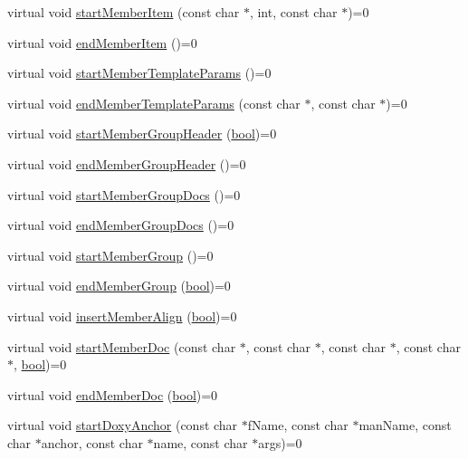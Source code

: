 \begin{DoxyCompactItemize}
\item 
virtual void \hyperlink{class_output_generator_a626142e0dd357e23058573aff5299eb6}{start\+Member\+Item} (const char $\ast$, int, const char $\ast$)=0
\item 
virtual void \hyperlink{class_output_generator_aac81201cfd0dedc7635bc81913906335}{end\+Member\+Item} ()=0
\item 
virtual void \hyperlink{class_output_generator_af221e843bf8828e9dcb45faea48c8af2}{start\+Member\+Template\+Params} ()=0
\item 
virtual void \hyperlink{class_output_generator_a0175d6eb2630de31743136c083d0cb84}{end\+Member\+Template\+Params} (const char $\ast$, const char $\ast$)=0
\item 
virtual void \hyperlink{class_output_generator_aea2631f3e52efb116a4b3375755024c8}{start\+Member\+Group\+Header} (\hyperlink{qglobal_8h_a1062901a7428fdd9c7f180f5e01ea056}{bool})=0
\item 
virtual void \hyperlink{class_output_generator_a585ab0b649dad9edf7b78e8f1ec20885}{end\+Member\+Group\+Header} ()=0
\item 
virtual void \hyperlink{class_output_generator_a0b3d9ddaa7d63cea43081ac17ce5e96b}{start\+Member\+Group\+Docs} ()=0
\item 
virtual void \hyperlink{class_output_generator_a7debb7a4d6584e8855e7dc9ce0594d99}{end\+Member\+Group\+Docs} ()=0
\item 
virtual void \hyperlink{class_output_generator_a1cc976995007c64aa044d98da900d09f}{start\+Member\+Group} ()=0
\item 
virtual void \hyperlink{class_output_generator_a6b020947c7d4cd3a2d2d8c0993fbb4e3}{end\+Member\+Group} (\hyperlink{qglobal_8h_a1062901a7428fdd9c7f180f5e01ea056}{bool})=0
\item 
virtual void \hyperlink{class_output_generator_a0df59cf6b0b238b48b139c7bfe5fb901}{insert\+Member\+Align} (\hyperlink{qglobal_8h_a1062901a7428fdd9c7f180f5e01ea056}{bool})=0
\item 
virtual void \hyperlink{class_output_generator_a9cd56ff964c1d6a592b25dd7fd036d23}{start\+Member\+Doc} (const char $\ast$, const char $\ast$, const char $\ast$, const char $\ast$, \hyperlink{qglobal_8h_a1062901a7428fdd9c7f180f5e01ea056}{bool})=0
\item 
virtual void \hyperlink{class_output_generator_adcab4ec924ae47924fdc3492a06d432b}{end\+Member\+Doc} (\hyperlink{qglobal_8h_a1062901a7428fdd9c7f180f5e01ea056}{bool})=0
\item 
virtual void \hyperlink{class_output_generator_ace0718073cbb95ce1908405e6eda095b}{start\+Doxy\+Anchor} (const char $\ast$f\+Name, const char $\ast$man\+Name, const char $\ast$anchor, const char $\ast$name, const char $\ast$args)=0

\end{DoxyCompactItemize}
